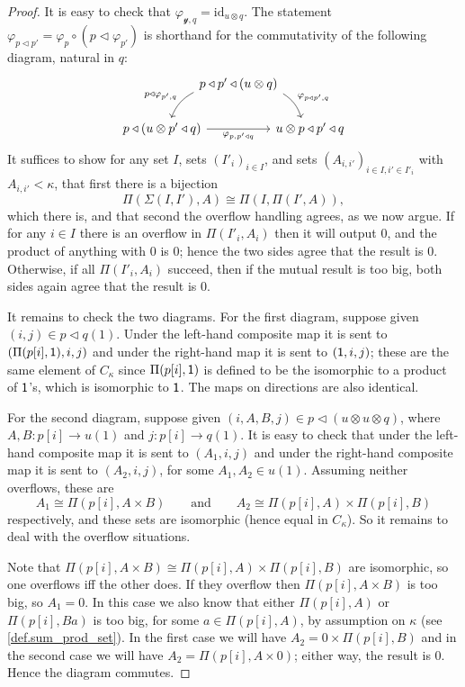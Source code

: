 \documentclass[11pt, one side, article]{memoir}
\theoremstyle{definition}
\theoremstyle{plain}
\newcommand{\id}{\mathrm{id}}
\newcommand{\yon}{\mathcal{y}}
\newcommand{\0}{\textsf{0}}
\newcommand{\1}{\tn{\textsf{1}}}
\newcommand{\tri}{\mathbin{\triangleleft}}
\newcommand{\qqand}{\qquad\text{and}\qquad}
\begin{document}
\begin{proof}
It is easy to check that $\varphi_{\yon,q}=\id_{u\otimes q}$. The statement $\varphi_{p\tri p'}=\varphi_{p}\circ (p\tri\varphi_{p'})$ is shorthand for the commutativity of the following diagram, natural in $q$:
\[
\begin{tikzcd}[column sep=-10pt]
	&p\tri p'\tri(u\otimes q)\ar[dl, bend right=20pt, "p\tri\varphi_{p',q}"']\ar[dr, bend left=20pt, "\varphi_{p\tri p',q}"]\\
	p\tri (u\otimes p'\tri q)\ar[rr, "\varphi_{p,p'\tri q}"']&&
	u\otimes p\tri p'\tri q
\end{tikzcd}
\]
It suffices to show for any set $I$, sets $(I'_i)_{i\in I}$, and sets $(A_{i,i'})_{i\in I, i'\in I'_i}$ with $A_{i,i'}<\kappa$, that first there is a bijection
\[
	\Pi(\Sigma(I,I'),A)\cong\Pi(I,\Pi(I',A)),
\]
which there is, and that second the overflow handling agrees, as we now argue. If for any $i\in I$ there is an overflow in $\Pi(I'_i,A_i)$ then it will output $0$, and the product of anything with $0$ is $0$; hence the two sides agree that the result is $0$. Otherwise, if all $\Pi(I'_i,A_i)$ succeed, then if the mutual result is too big, both sides again agree that the result is $0$.

It remains to check the two diagrams. For the first diagram, suppose given $(i,j)\in p\tri q(1)$. Under the left-hand composite map it is sent to $(\Pi(p[i],\1),i,j)$ and under the right-hand map it is sent to $(\1,i,j)$; these are the same element of $C_\kappa$  since $\Pi(p[i],\1)$ is defined to be the isomorphic to a product of $\1$'s, which is isomorphic to $\1$. The maps on directions are also identical.

For the second diagram, suppose given $(i,A,B,j)\in p\tri(u\otimes u\otimes q)$, where $A,B\colon p[i]\to u(1)$ and $j\colon p[i]\to q(1)$. It is easy to check that under the left-hand composite map it is sent to $(A_1,i,j)$ and under the right-hand composite map it is sent to $(A_2,i,j)$, for some $A_1,A_2\in u(1)$. Assuming neither overflows, these are 
\[
  A_1\cong\Pi(p[i],A\times B)
  \qqand
	A_2\cong\Pi(p[i],A)\times\Pi(p[i],B)
\] 
respectively, and these sets are isomorphic (hence equal in $C_\kappa$). So it remains to deal with the overflow situations.

Note that $\Pi(p[i],A\times B)\cong\Pi(p[i],A)\times\Pi(p[i],B)$ are isomorphic, so one overflows iff the other does. If they overflow then $\Pi(p[i],A\times B)$ is too big, so $A_1=0$. In this case we also know that either $\Pi(p[i],A)$ or $\Pi(p[i],Ba)$ is too big, for some $a\in\Pi(p[i],A)$, by assumption on $\kappa$ (see \cref{def.sum_prod_set}). In the first case we will have $A_2=0\times\Pi(p[i],B)$ and in the second case we will have $A_2=\Pi(p[i],A\times 0)$; either way, the result is $0$. Hence the diagram commutes.
\end{proof}
\end{document}
